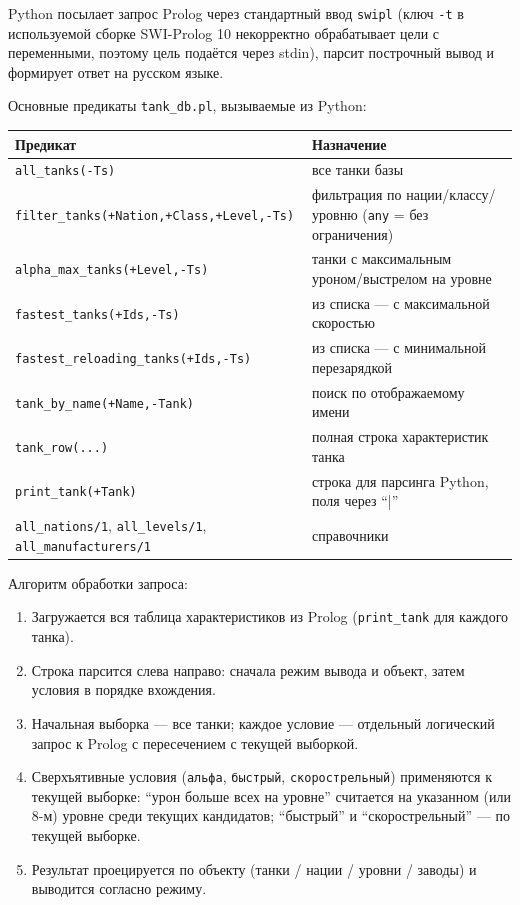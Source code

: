 \documentclass[12pt,a4paper]{article}
\begin{document}
Python посылает запрос Prolog через стандартный ввод \texttt{swipl} (ключ \texttt{-t} в используемой сборке SWI-Prolog 10 некорректно обрабатывает цели с переменными, поэтому цель подаётся через stdin), парсит построчный вывод и формирует ответ на русском языке.

Основные предикаты \texttt{tank\_db.pl}, вызываемые из Python:
\begin{center}
\begin{tabular}{ll}
\toprule
Предикат & Назначение \\
\midrule
\texttt{all\_tanks(-Ts)} & все танки базы \\
\texttt{filter\_tanks(+Nation,+Class,+Level,-Ts)} & фильтрация по нации/классу/уровню (\texttt{any} = без ограничения) \\
\texttt{alpha\_max\_tanks(+Level,-Ts)} & танки с максимальным уроном/выстрелом на уровне \\
\texttt{fastest\_tanks(+Ids,-Ts)} & из списка --- с максимальной скоростью \\
\texttt{fastest\_reloading\_tanks(+Ids,-Ts)} & из списка --- с минимальной перезарядкой \\
\texttt{tank\_by\_name(+Name,-Tank)} & поиск по отображаемому имени \\
\texttt{tank\_row(...)} & полная строка характеристик танка \\
\texttt{print\_tank(+Tank)} & строка для парсинга Python, поля через ``|'' \\
\texttt{all\_nations/1}, \texttt{all\_levels/1}, \texttt{all\_manufacturers/1} & справочники \\
\bottomrule
\end{tabular}
\end{center}

Алгоритм обработки запроса:
\begin{enumerate}
\item Загружается вся таблица характеристиков из Prolog (\texttt{print\_tank} для каждого танка).
\item Строка парсится слева направо: сначала режим вывода и объект, затем условия в порядке вхождения.
\item Начальная выборка --- все танки; каждое условие --- отдельный логический запрос к Prolog с пересечением с текущей выборкой.
\item Сверхъятивные условия (\texttt{альфа}, \texttt{быстрый}, \texttt{скорострельный}) применяются к текущей выборке: ``урон больше всех на уровне'' считается на указанном (или 8-м) уровне среди текущих кандидатов; ``быстрый'' и ``скорострельный'' --- по текущей выборке.
\item Результат проецируется по объекту (танки / нации / уровни / заводы) и выводится согласно режиму.
\end{enumerate}
\end{document}
